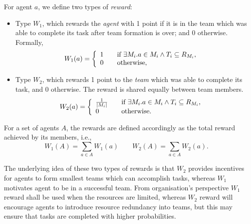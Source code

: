 \documentclass{llncs}
\begin{document}
\begin{definition}[Rewards]
For agent $a$, we define two types of \emph{reward}:
\begin{itemize}
    \item Type $W_1$, which rewards the \emph{agent} with 1 point if it is in the team which was able to complete its task after team formation is over; and 0 otherwise. Formally,
    \begin{equation} \label{eq:w1agent}
W_1(a) = \left\{
  \begin{array}{l l}
    1 & \quad \text{if $\exists M_i . a \in M_i \wedge T_i \subseteq R_{M_i}$,}\\
    0 & \quad \text{otherwise,}\\
  \end{array} \right.
\end{equation}

    \item Type $W_2$, which rewards 1 point to the \emph{team} which was able to complete its task, and 0 otherwise. The reward is shared equally between team members.
\begin{equation}
W_2(a) = \left\{
  \begin{array}{l l}
    \frac{1}{|M_i|} & \quad \text{if $\exists M_i . a \in M_i \wedge T_i \subseteq R_{M_i}$,}\\
    0 & \quad \text{otherwise.}\\
  \end{array} \right.
\label{eq:w2agent}
\end{equation}
\end{itemize}


For a set of agents $A$, the rewards are defined accordingly as the total reward achieved by its members, i.e.,
\begin{equation} \label{eq:w1organisation}
 W_1(A) = \sum_{a \in A} W_1(a) \qquad
%
 W_2(A) = \sum_{a \in A} W_2(a).
\end{equation}
\end{definition}

The underlying idea of these two types of rewards is that $W_2$ provides
incentives for agents to form smallest teams which can accomplish tasks, whereas $W_1$
motivates agent to be in a successful team. From organisation's perspective $W_1$ reward
shall be used when the resources are limited, whereas $W_2$ reward will encourage agents to introduce
resource redundancy into teams, but this may ensure that tasks are completed with higher
probabilities.
\end{document}
